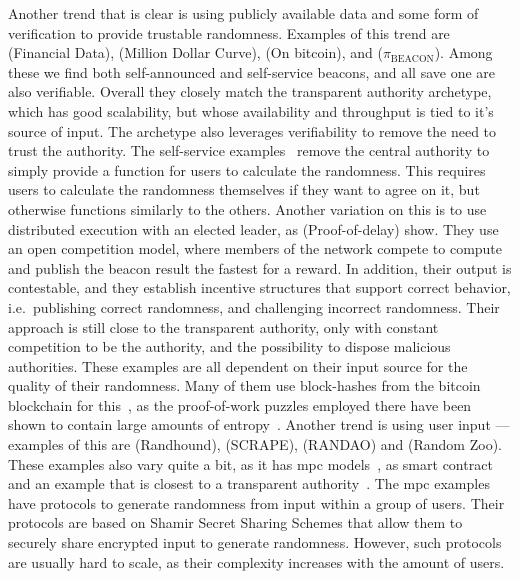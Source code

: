 Another trend that is clear is using publicly available data and some form of verification to provide trustable randomness. Examples of this trend are \citet{clark2010use} (Financial Data), \citet{baigneres2015trap} (Million Dollar Curve), \citet{bonneau2015bitcoin} (On bitcoin), and \citet{bentov2016bitcoin} ($\pi_\text{BEACON}$). Among these we find both self-announced and self-service beacons, and all save one are also verifiable. Overall they closely match the transparent authority archetype, which has good scalability, but whose availability and throughput is tied to it's source of input. The archetype also leverages verifiability to remove the need to trust the authority. The self-service examples~\cite{bonneau2015bitcoin, bentov2016bitcoin} remove the central authority to simply provide a function for users to calculate the randomness. This requires users to calculate the randomness themselves if they want to agree on it, but otherwise functions similarly to the others. Another variation on this is to use distributed execution with an elected leader, as \citet{bunz2017proofsof} (Proof-of-delay) show. They use an open competition model, where members of the network compete to compute and publish the beacon result the fastest for a reward. In addition, their output is contestable, and they establish incentive structures that support correct behavior, i.e.\ publishing correct randomness, and challenging incorrect randomness. Their approach is still close to the transparent authority, only with constant competition to be the authority, and the possibility to dispose malicious authorities.
These examples are all dependent on their input source for the quality of their randomness. Many of them use block-hashes from the bitcoin blockchain for this~\cite{bonneau2015bitcoin, bentov2016bitcoin, bunz2017proofsof}, as the proof-of-work puzzles employed there have been shown to contain large amounts of entropy~\cite{bonneau2015bitcoin}.  %
Another trend is using user input --- examples of this are \citet{syta2017scalable} (Randhound), \citet{cascudo2017scrape} (SCRAPE), \citet{randao} (RANDAO) and \citet{lenstra2015random} (Random Zoo). These examples also vary quite a bit, as it has \gls{mpc} models~\cite{syta2017scalable, cascudo2017scrape}, as smart contract~\cite{randao} and an example that is closest to a transparent authority~\cite{lenstra2015random}. The \gls{mpc} examples have protocols to generate randomness from input within a group of users. Their protocols are based on Shamir Secret Sharing Schemes that allow them to securely share encrypted input to generate randomness. However, such protocols are usually hard to scale, as their complexity increases with the amount of users.

